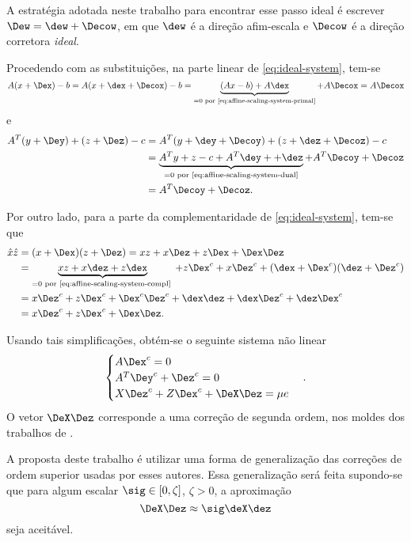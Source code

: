 A estratégia adotada neste trabalho para encontrar esse passo ideal é  escrever
$\Dew = \dew + \Decow$, em que  $\dew$ é a direção afim-escala e $\Decow$ é a direção corretora 
\emph{ideal}.

Procedendo com as substituições, na parte linear de \eqref{eq:ideal-system},
tem-se
\[ A(x+\Dex) - b = A(x+\dex + \Decox) - b = \underbrace{(Ax - b) + A\dex}_{=0
\text{ por \eqref{eq:affine-scaling-system-primal}}} + A\Decox = A\Decox \] 
e
\begin{align*}
A^T(y+\Dey) + (z+\Dez) - c &= A^T(y+\dey+\Decoy) + (z+\dez+\Decoz) - c \\
						  &= \underbrace{A^Ty + z - c + A^T\dey+ +\dez}_{=0 
						  \text{ por \eqref{eq:affine-scaling-system-dual}}} +
						   A^T\Decoy +\Decoz \\
						  &=  A^T\Decoy +\Decoz.
\end{align*} 

Por outro lado, para a parte da complementaridade de 
\eqref{eq:ideal-system}, tem-se que
\begin{align*}
\hat{x}\hat{z} &= (x + \Dex)(z+\Dez) = xz + x\Dez + z\Dex + \Dex\Dez \\
                &= \underbrace{xz + x\dez + z\dex}_{=0 \text{ por
                \eqref{eq:affine-scaling-system-compl} }}  + z\Dex^c + x\Dez^c + (\dex + \Dex^c)(\dez + \Dez^c) \\
                &=  x\Dez^c  +z\Dex^c + \Dex^c\Dez^c + \dex\dez 
                + \dex\Dez^c + \dez\Dex^c \\
                &=         x\Dez^c  +z\Dex^c + \Dex\Dez.     
\end{align*}
  
Usando tais simplificações, obtém-se o seguinte sistema não linear
\begin{equation}\begin{cases}
A\Dex^c =  0\\
A^T\Dey^c +\Dez^c =  0\\
X\Dez^c + Z\Dex^c + \DeX\Dez = \mu e 
\label{eq:corrector-nonlinear}
\end{cases}.
\end{equation}
O vetor $\DeX\Dez$ corresponde a uma correção de segunda ordem, nos moldes dos
trabalhos de \textcite{Mehrotra:1992wr,Gondzio:1996uw}.



A proposta deste trabalho é utilizar uma  forma de generalização das correções
de ordem superior usadas por esses autores.
Essa generalização será feita supondo-se que para algum escalar
$\sig\in[0,\zeta]$, $\zeta>0$, a aproximação
\begin{equation}
\label{eq:aproximacao-direcao}
\DeX\Dez \approx \sig \deX\dez
\end{equation} 
seja aceitável.

